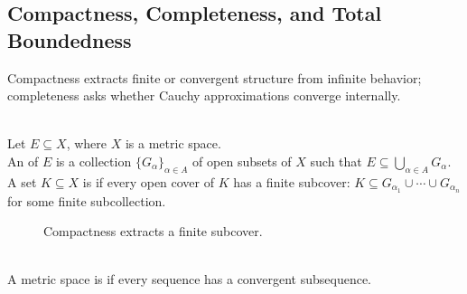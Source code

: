 \subsection{Compactness, Completeness, and Total Boundedness}\label{subsec:compactness-and-completeness}

%


Compactness extracts finite or convergent structure from infinite behavior; completeness asks whether Cauchy approximations converge internally.

\begin{definition} \label{def:open-cover-and-compactness} \\
Let $E\subseteq X$, where $X$ is a metric space.\\
An  of $E$ is a collection $\{G_\alpha\}_{\alpha\in A}$ of open subsets of $X$ such that $E\subseteq\bigcup\limits_{\alpha\in A}G_\alpha$. A set $K\subseteq X$ is  if every open cover of $K$ has a finite subcover: $K\subseteq G_{\alpha_1}\cup\cdots\cup G_{\alpha_n}$ for some finite subcollection.
\end{definition}

\begin{figure}[H]
  \centering
  
  \caption{Compactness extracts a finite subcover.}
  \label{fig:compactness-finite-subcover}
\end{figure}

\begin{definition} \label{def:sequentially-compact-metric-space} \\
A metric space is  if every sequence has a convergent subsequence.
\end{definition}

